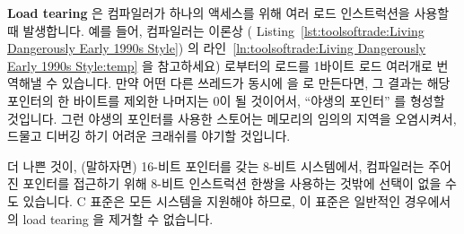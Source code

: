 \fi

{\bf Load tearing} 은 컴파일러가 하나의 액세스를 위해 여러 로드 인스트럭션을
사용할 때 발생합니다.
예를 들어, 컴파일러는 이론상  (
Listing~\ref{lst:toolsoftrade:Living Dangerously Early 1990s Style}) 의
라인~\ref{ln:toolsoftrade:Living Dangerously Early 1990s Style:temp} 을
참고하세요) 로부터의 로드를 1바이트 로드 여러개로 번역해낼 수 있습니다.
만약 어떤 다른 쓰레드가 동시에  을  로 만든다면, 그
결과는 해당 포인터의 한 바이트를 제외한 나머지는 0이 될 것이어서, ``야생의
포인터'' 를 형성할 것입니다.
그런 야생의 포인터를 사용한 스토어는 메모리의 임의의 지역을 오염시켜서, 드물고
디버깅 하기 어려운 크래쉬를 야기할 것입니다.

더 나쁜 것이, (말하자면) 16-비트 포인터를 갖는 8-비트 시스템에서, 컴파일러는
주어진 포인터를 접근하기 위해 8-비트 인스트럭션 한쌍을 사용하는 것밖에 선택이
없을 수도 있습니다.
C 표준은 모든 시스템을 지원해야 하므로, 이 표준은 일반적인 경우에서의 load
tearing 을 제거할 수 없습니다.

